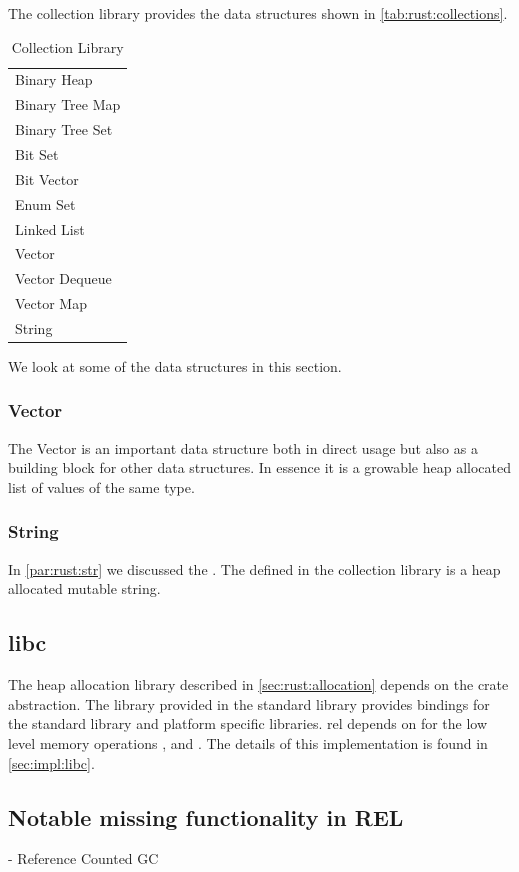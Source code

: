 The {\rust} collection library provides the data structures shown in \autoref{tab:rust:collections}.

\begin{table}[H]
  \begin{tabular}{l}
    Binary Heap \\
    Binary Tree Map \\
    Binary Tree Set \\
    Bit Set \\
    Bit Vector \\
    Enum Set \\
    Linked List \\
    Vector \\
    Vector Dequeue \\
    Vector Map \\
    String \\
  \end{tabular}
  \caption{\rust Collection Library}
  \label{tab:rust:collections}
\end{table}

We look at some of the data structures in this section.

\subsubsection{Vector}

The Vector is an important data structure both in direct usage but also as a building block for other data structures.
In essence it is a growable heap allocated list of values of the same type.

\subsubsection{String}

In \autoref{par:rust:str} we discussed the .
The  defined in the collection library is a heap allocated mutable string.

\subsection{libc}

The heap allocation library described in \autoref{sec:rust:allocation} depends on the  crate abstraction.
The  library provided in the standard library provides bindings for the {\C} standard library and platform specific libraries.
\gls{rel} depends on  for the low level memory operations ,  and .
The details of this implementation is found in \autoref{sec:impl:libc}. 

\subsection{Notable missing functionality in REL}

- Reference Counted GC
